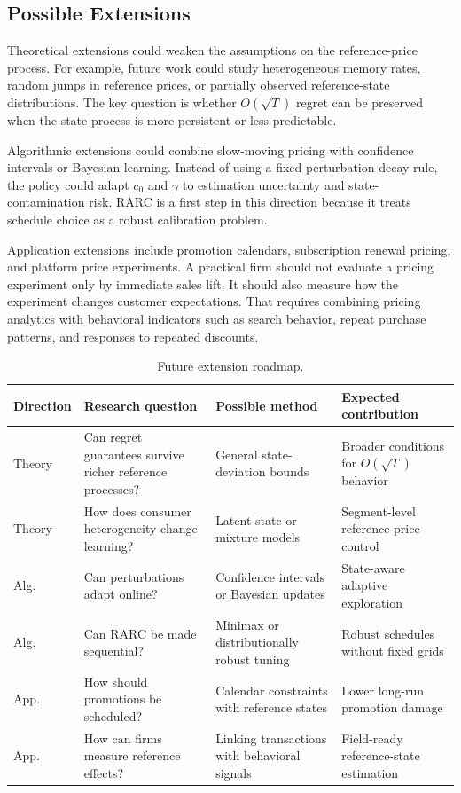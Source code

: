 \documentclass[conference]{../../LaTex_Template/IEEEtran}
\begin{document}
\subsection{Possible Extensions}
Theoretical extensions could weaken the assumptions on the reference-price process. For example, future work could study heterogeneous memory rates, random jumps in reference prices, or partially observed reference-state distributions. The key question is whether $O(\sqrt{T})$ regret can be preserved when the state process is more persistent or less predictable.

Algorithmic extensions could combine slow-moving pricing with confidence intervals or Bayesian learning. Instead of using a fixed perturbation decay rule, the policy could adapt $c_0$ and $\gamma$ to estimation uncertainty and state-contamination risk. RARC is a first step in this direction because it treats schedule choice as a robust calibration problem.

Application extensions include promotion calendars, subscription renewal pricing, and platform price experiments. A practical firm should not evaluate a pricing experiment only by immediate sales lift. It should also measure how the experiment changes customer expectations. That requires combining pricing analytics with behavioral indicators such as search behavior, repeat purchase patterns, and responses to repeated discounts.

\begin{table}[H]
\centering
\footnotesize
\setlength{\tabcolsep}{1pt}
\caption{Future extension roadmap.}
\label{tab:roadmap}
\begin{tabular}{p{}p{}p{}p{}}
\hline
Direction & Research question & Possible method & Expected contribution\\
\hline
Theory & Can regret guarantees survive richer reference processes? & General state-deviation bounds & Broader conditions for $O(\sqrt{T})$ behavior\\
Theory & How does consumer heterogeneity change learning? & Latent-state or mixture models & Segment-level reference-price control\\
Alg. & Can perturbations adapt online? & Confidence intervals or Bayesian updates & State-aware adaptive exploration\\
Alg. & Can RARC be made sequential? & Minimax or distributionally robust tuning & Robust schedules without fixed grids\\
App. & How should promotions be scheduled? & Calendar constraints with reference states & Lower long-run promotion damage\\
App. & How can firms measure reference effects? & Linking transactions with behavioral signals & Field-ready reference-state estimation\\
\hline
\end{tabular}
\end{table}
\end{document}
